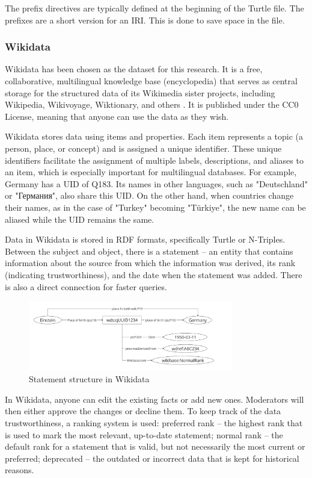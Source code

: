 The prefix directives are typically defined at the beginning of the Turtle file. The prefixes are a short version for an IRI. This is done to save space in the file.

\subsubsection{Wikidata}

Wikidata has been chosen as the dataset for this research. It is a free, collaborative, multilingual knowledge base (encyclopedia) that serves as central storage for the structured data of its Wikimedia sister projects, including Wikipedia, Wikivoyage, Wiktionary, and others \citep{vrandecic2014wikidata}. It is published under the CC0 License, meaning that anyone can use the data as they wish.

Wikidata stores data using items and properties. Each item represents a topic (a person, place, or concept) and is assigned a unique identifier. These unique identifiers facilitate the assignment of multiple labels, descriptions, and aliases to an item, which is especially important for multilingual databases. For example, Germany has a UID of Q183. Its names in other languages, such as "Deutschland" or "Германия", also share this UID. On the other hand, when countries change their names, as in the case of "Turkey" becoming "Türkiye", the new name can be aliased while the UID remains the same.

Data in Wikidata is stored in RDF formats, specifically Turtle or N-Triples. Between the subject and object, there is a statement – an entity that contains information about the source from which the information was derived, its rank (indicating trustworthiness), and the date when the statement was added. There is also a direct connection for faster queries.

\begin{figure}[htbp]
    \centering
    \includegraphics[width=0.8\textwidth]{6.png}
    \caption{Statement structure in Wikidata}
    \label{fig:image6}
\end{figure}

In Wikidata, anyone can edit the existing facts or add new ones. Moderators will then either approve the changes or decline them. To keep track of the data trustworthiness, a ranking system is used: preferred rank – the highest rank that is used to mark the most relevant, up-to-date statement; normal rank – the default rank for a statement that is valid, but not necessarily the most current or preferred; deprecated – the outdated or incorrect data that is kept for historical reasons.

